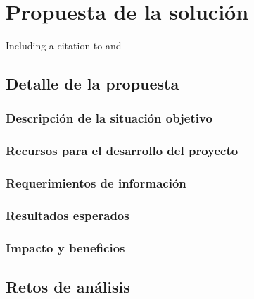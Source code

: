 \chapter{Propuesta de la solución}
\label{chapter:proposal}

Including a citation to \cite{latex} and \cite{Chakravarthy2009}

\Blindtext[3]

\section{Detalle de la propuesta}
\label{section:propuesta}

\Blindtext[3]

\subsection{Descripción de la situación objetivo}
\label{subection:prop:situacion-objetivo}

\Blindtext[3]

\subsection{Recursos para el desarrollo del proyecto}
\label{subsection:prop:recursos}

\Blindtext[1]

\subsection{Requerimientos de información}
\label{subsection:prop:info}

\Blindtext[2]

\subsection{Resultados esperados}
\label{subsection:prop:resultados}

\Blindtext[3]

\subsection{Impacto y beneficios}
\label{subsection:prop:impacto}

\Blindtext[4]

\section{Retos de análisis}
\label{section:retos}

